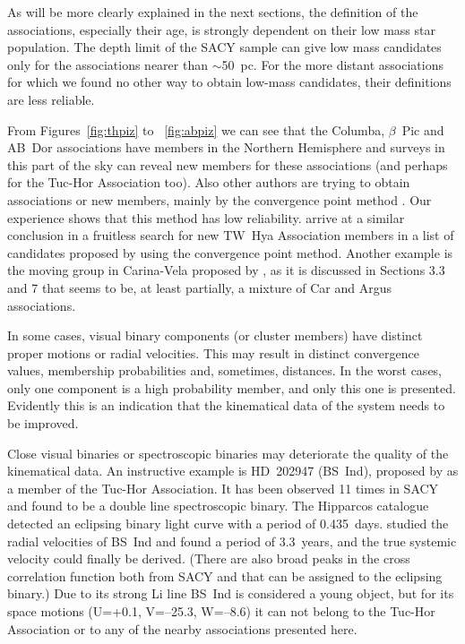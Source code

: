 \documentclass[11pt,twoside]{book}
\begin{document}
As will be more clearly explained in the next sections, the
definition of the associations, especially their age, is strongly dependent
on their low mass star population.  The depth limit of the SACY sample
can give low mass candidates only for the associations nearer than
$\sim$50~pc.  For the more distant associations for which we found no other
way to obtain low-mass candidates, their definitions are less reliable.

From Figures~\ref{fig:thpiz} to ~\ref{fig:abpiz} we can see that the
Columba, $\beta$~Pic and AB~Dor associations have members in the
Northern Hemisphere and surveys in this part of the sky can reveal new
members for these associations (and perhaps for the Tuc-Hor
Association too).  Also other authors are trying to obtain associations or
new members, mainly by the convergence point method \cite[see, for
example,][]{debruijne99}.  Our experience shows that this method has
low reliability.  \citet{song02b} arrive at a similar conclusion in a
fruitless search for new TW~Hya Association members in a list of
candidates proposed by \citet{makarov01} using the convergence point
method.  Another example is the moving group in Carina-Vela proposed
by \citet{makarov00}, as it is discussed in Sections 3.3 and 7 that
seems to be, at least partially, a mixture of Car and Argus
associations.

In some cases, visual binary components (or cluster members)
have distinct proper motions or radial velocities.
This may result in distinct convergence values, membership probabilities and, sometimes, distances.
In the worst cases, only one component is a  high probability member,
and only this one is presented.
Evidently this is an indication that the kinematical data of the system needs to be improved.

Close visual binaries or spectroscopic binaries may deteriorate the quality of the kinematical data.
An instructive example is HD~202947 (BS~Ind),  proposed by \citet{zuckerman04}
as a member of the Tuc-Hor Association.
It has been observed 11 times in SACY and  found to be a double line spectroscopic binary.
The Hipparcos catalogue detected an eclipsing binary light curve with a period of 0.435~days.
\citet{guenther05} studied the radial velocities of BS~Ind and found a period of 3.3~years,
and the true systemic velocity could finally be derived.
(There are also broad peaks in the cross correlation function both from SACY and
\citet{guenther05} that can be assigned to the eclipsing binary.)
Due to its strong Li line BS~Ind is considered a young object,
but for its space motions (U=+0.1, V=--25.3, W=--8.6) it can not belong to the
Tuc-Hor Association or to any of the nearby associations presented here.
\end{document}
